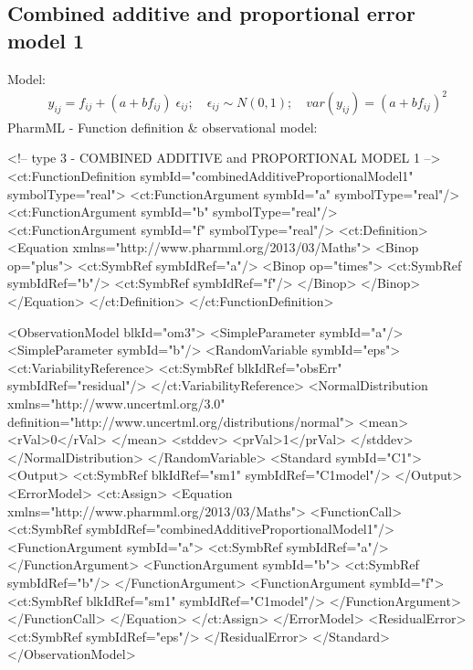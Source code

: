 \documentclass[a4paper,10pt]{article}
\begin{document}
\subsection{Combined additive and proportional error model 1}
\label{model3}
Model:
\begin{eqnarray}
&& y_{ij} =  f_{ij} + (a + bf_{ij}) \; \epsilon_{ij}; \quad \epsilon_{ij} \sim N(0,1);\quad \mathit{var}(y_{ij}) = (a + bf_{ij})^2 \nonumber
\end{eqnarray}
PharmML - Function definition \& observational model:
\begin{xmlcode}
<!-- type 3 - COMBINED ADDITIVE and PROPORTIONAL MODEL 1 -->
<ct:FunctionDefinition symbId="combinedAdditiveProportionalModel1" symbolType="real">
    <ct:FunctionArgument symbId="a" symbolType="real"/>
    <ct:FunctionArgument symbId="b" symbolType="real"/>
    <ct:FunctionArgument symbId="f" symbolType="real"/>
    <ct:Definition>
        <Equation xmlns="http://www.pharmml.org/2013/03/Maths">
            <Binop op="plus">
                <ct:SymbRef symbIdRef="a"/>
                <Binop op="times">
                    <ct:SymbRef symbIdRef="b"/>
                    <ct:SymbRef symbIdRef="f"/>
                </Binop>                   
            </Binop>
        </Equation>
    </ct:Definition>
</ct:FunctionDefinition>

<ObservationModel blkId="om3">
    <SimpleParameter symbId="a"/>
    <SimpleParameter symbId="b"/>
    <RandomVariable symbId="eps">
        <ct:VariabilityReference>
            <ct:SymbRef blkIdRef="obsErr" symbIdRef="residual"/>
        </ct:VariabilityReference>
        <NormalDistribution xmlns="http://www.uncertml.org/3.0" definition="http://www.uncertml.org/distributions/normal">
            <mean>
                <rVal>0</rVal>
            </mean>
            <stddev>
                <prVal>1</prVal>
            </stddev>
        </NormalDistribution>
    </RandomVariable>
    <Standard symbId="C1">
        <Output>
            <ct:SymbRef blkIdRef="sm1" symbIdRef="C1model"/>
        </Output>
        <ErrorModel>
            <ct:Assign>
                <Equation xmlns="http://www.pharmml.org/2013/03/Maths">
                    <FunctionCall>
                        <ct:SymbRef symbIdRef="combinedAdditiveProportionalModel1"/>
                        <FunctionArgument symbId="a">
                            <ct:SymbRef symbIdRef="a"/>
                        </FunctionArgument>
                        <FunctionArgument symbId="b">
                            <ct:SymbRef symbIdRef="b"/>
                        </FunctionArgument>
                        <FunctionArgument symbId="f">
                            <ct:SymbRef blkIdRef="sm1" symbIdRef="C1model"/>
                        </FunctionArgument>
                    </FunctionCall>
                </Equation>
            </ct:Assign>
        </ErrorModel>
        <ResidualError>
            <ct:SymbRef symbIdRef="eps"/>
        </ResidualError>
    </Standard>
</ObservationModel>
\end{xmlcode}
\end{document}
